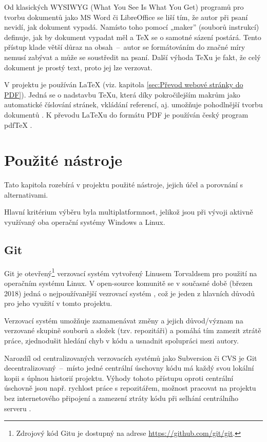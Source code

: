 \documentclass[a4paper, 12pt]{article}
\begin{document}
  Od klasických WYSIWYG (What You See Is What You Get) programů pro tvorbu dokumentů jako MS Word či LibreOffice se liší tím, že autor při psaní nevidí, jak dokument vypadá. Namísto toho pomocí „maker” (souborů instrukcí) definuje, jak by dokument vypadat měl a \TeX{} se o samotné sázení postárá. Tento přístup klade větší důraz na obsah~--~autor se formátováním do značné míry nemusí zabývat a může se soustředit na psaní. Další výhoda \TeX u je fakt, že celý dokument je prostý text, proto jej lze verzovat.

  V projektu je používán \LaTeX{} (viz. kapitola \ref{sec:Převod webové stránky do PDF}). Jedná se o nadstavbu \TeX u, která díky pokročilejším makrům jako automatické číslování stránek, vkládání referencí, aj. umožňuje pohodlnější tvorbu dokumentů \cite{getting-started-with-latex}. K převodu \LaTeX u do formátu PDF je používán český program pdf\TeX{} \cite{pdftex}.


  \section{Použité nástroje} \label{sec:Použité nástroje}
  Tato kapitola rozebírá v projektu použité nástroje, jejich účel a porovnání s alternativami.

  Hlavní kritérium výběru byla multiplatformnost, jelikož jsou při vývoji aktivně využívaný oba operační systémy Windows a Linux.



  \subsection{Git} \label{sec:Git}
  Git je otevřený\footnote{Zdrojový kód Gitu je dostupný na adrese \url{https://github.com/git/git}.} verzovací systém vytvořený Linusem Torvaldsem pro použití na operačním systému Linux. V open-source komunitě se v současné době (březen 2018) jedná o nejpoužívanější vezrovací systém \cite{version-control-usage-statistics}, což je jeden z hlavních důvodů pro jeho využití v tomto projektu.

  Verzovací systém umožňuje zaznamenávat změny a jejich důvod/význam na verzované skupině souborů a složek (tzv. repozitáři) a pomáhá tím zamezit ztrátě práce, zjednodušit hledání chyb v kódu a usnadnit spolupráci mezi autory.

  Narozdíl od centralizovaných verzovacích systémů jako Subversion či CVS je Git decentralizovaný~--~místo jedné centrální úschovny kódu má každý svou lokální kopii s úplnou historií projektu. Výhody tohoto přístupu oproti centrální úschovně jsou např. rychlost práce s repozitářem, možnost pracovat na projektu bez internetového připojení a zamezení ztráty kódu při selhání centrálního serveru \cite{cvcs-vs-dvcs}.
\end{document}
